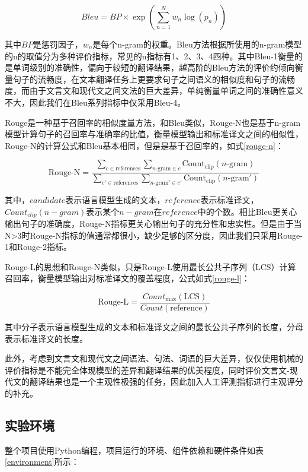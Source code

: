 \documentclass[
    decl-page,  %
    ,fontset = win, %
  ]{njuthesis}
\begin{document}
\begin{equation}
\label{bleu}
Bleu = BP \times \exp\left(\sum_{n=1}^N w_n \log(p_n)\right)
\end{equation}

其中$BP$是惩罚因子，$w_n$是每个n-gram的权重。Bleu方法根据所使用的n-gram模型的n的取值分为多种评价指标，常见的n指标有1、2、3、4四种。其中Bleu-1衡量的是单词级别的准确性，偏向于较短的翻译结果，越高阶的Bleu方法的评价约倾向衡量句子的流畅度，在文本翻译任务上更要求句子之间语义的相似度和句子的流畅度，而由于文言文和现代文之间文法的巨大差异，单纯衡量单词之间的准确性意义不大，因此我们在Bleu系列指标中仅采用Bleu-4。

Rouge是一种基于召回率的相似度量方法，和Bleu类似，Rouge-N也是基于n-gram模型计算句子的召回率与准确率的比值，衡量模型输出和标准译文之间的相似性，Rouge-N的计算公式和Bleu基本相同，但是是基于召回率的，如式\ref{rouge-n}：

\begin{equation}
\label{rouge-n}
\text{Rouge-N} = \frac{\sum_{c \in \text{references}} \sum_{n\text{-gram} \in c} \text{Count}_{\text{clip}}(n\text{-gram})}{\sum_{c' \in \text{references}} \sum_{n\text{-gram}' \in c'} \text{Count}_{\text{clip}}(n\text{-gram}')}
\end{equation}

其中，$candidate$表示语言模型生成的文本，$reference$表示标准译文，$Count_{clip}(n-gram)$表示某个$n-gram$在$reference$中的个数。相比Bleu更关心输出句子的准确度，Rouge-N指标更关心输出句子的充分性和忠实性。但是由于当N>3时Rouge-N指标的值通常都很小，缺少足够的区分度，因此我们只采用Rouge-1和Rouge-2指标。

Rouge-L的思想和Rouge-N类似，只是Rouge-L使用最长公共子序列（LCS）计算召回率，衡量模型输出对标准译文的覆盖程度，公式如式\ref{rouge-l}：

\begin{equation}
\label{rouge-l}
\text{Rouge-L} = \frac{Count_{\text{max}}(\text{LCS})}{Count(\text{reference})}
\end{equation}

其中分子表示语言模型生成的文本和标准译文之间的最长公共子序列的长度，分母表示标准译文的长度。

此外，考虑到文言文和现代文之间语法、句法、词语的巨大差异，仅仅使用机械的评价指标是不能完全体现模型的差异和翻译结果的优美程度，同时评价文言文-现代文的翻译结果也是一个主观性极强的任务，因此加入人工评测指标进行主观评分的补充。

\subsection{实验环境}
整个项目使用Python编程，项目运行的环境、组件依赖和硬件条件如表\ref{environment}所示：
\end{document}
